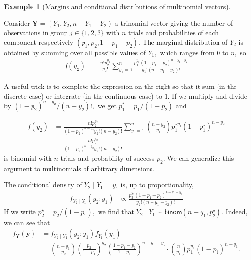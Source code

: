 \documentclass[
  11pt,
  letterpaper,
]{scrbook}
\theoremstyle{definition}
\newtheorem{example}{Example}[chapter]
\theoremstyle{plain}
\theoremstyle{plain}
\theoremstyle{plain}
\theoremstyle{definition}
\theoremstyle{definition}
\theoremstyle{plain}
\theoremstyle{plain}
\theoremstyle{remark}
\begin{document}
\begin{example}[Margins and conditional distributions of multinomial
vectors]\protect\hypertarget{exm-marginal-multinom}{}\label{exm-marginal-multinom}

Consider \(\boldsymbol{Y} = (Y_1, Y_2, n-Y_1-Y_2)\) a trinomial vector
giving the number of observations in group \(j \in \{1,2,3\}\) with
\(n\) trials and probabilities of each component respectively
\((p_1, p_2, 1-p_1-p_2).\) The marginal distribution of \(Y_2\) is
obtained by summing over all possible values of \(Y_1,\) which ranges
from \(0\) to \(n,\) so \begin{align*}
f(y_2) &= \frac{n!p_2^{y_2}}{y_2!}\sum_{y_1=1}^n \frac{p_1^{y_1}(1-p_1 -p_2)^{n-y_1-y_2}}{y_1!(n-y_1-y_2)!}
\end{align*}

A useful trick is to complete the expression on the right so that it sum
(in the discrete case) or integrate (in the continuous case) to \(1.\)
If we multiply and divide by \((1-p_2)^{n-y_2} /(n-y_2)!,\) we get
\(p_1^*=p_1/(1-p_2)\) and

\begin{align*}
f(y_2) &= \frac{n!p_2^{y_2}}{(1-p_2)^{n-y_2} y_2!(n-y_2)!}\sum_{y_1=1}^n \binom{n-y_2}{y_1} p_1^{\star y_1}(1-p^{\star}_1)^{n-y_2}
\\&= \frac{n!p_2^{y_2}}{(1-p_2)^{n-y_2} y_2!(n-y_2)!}
\end{align*} is binomial with \(n\) trials and probability of success
\(p_2.\) We can generalize this argument to multinomials of arbitrary
dimensions.

The conditional density of \(Y_2 \mid Y_1=y_1\) is, up to
proportionality, \begin{align*}
f_{Y_2 \mid Y_1}(y_2; y_1) &\propto \frac{p_2^{y_2}(1-p_1 -p_2)^{n-y_1-y_2}}{y_2!(n-y_1-y_2)!}
\end{align*} If we write \(p_2^\star=p_2/(1-p_1),\) we find that
\(Y_2 \mid Y_1 \sim \mathsf{binom}(n-y_1, p_2^\star).\) Indeed, we can
see that \begin{align*}
f_{\boldsymbol{Y}}(\boldsymbol{y}) &= f_{Y_2 \mid Y_1}(y_2; y_1) f_{Y_1}(y_1) 
\\&= \binom{n-y_1}{y_2} \left( \frac{p_2}{1-p_1}\right)^{y_2}\left(\frac{1-p_1-p_2}{1-p_1}\right)^{n-y_1-y_2}\!\!\cdot\binom{n}{y_1} p_1^{y_1}(1-p_1)^{n-y_1}.
\end{align*}

\end{example}
\end{document}
